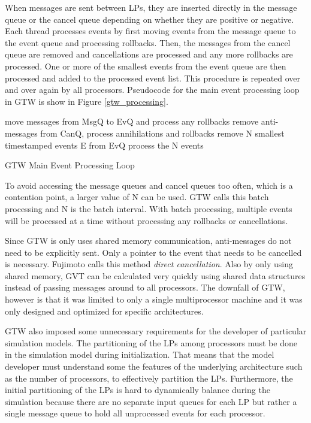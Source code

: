 \documentclass[11pt]{book}
\begin{document}
\noindent
When messages are sent between LPs, they are inserted directly in the message queue or the cancel
queue depending on whether they are positive or negative.  Each thread processes events by first
moving events from the message queue to the event queue and processing rollbacks.  Then, the
messages from the cancel queue are removed and cancellations are processed and any more rollbacks
are processed.  One or more of the smallest events from the event queue are then processed and added
to the processed event list.  This procedure is repeated over and over again by all processors.
Pseudocode for the main event processing loop in GTW is show in Figure \ref{gtw_processing}.

\begin{algorithm}
\DontPrintSemicolon
     {
        move messages from MsgQ to EvQ and process any rollbacks\;
        remove anti-messages from CanQ, process annihilations and rollbacks\;
        remove N smallest timestamped events E from EvQ\;
        process the N events\;
    }
\caption{GTW Main Event Processing Loop\cite{das-94,fujimoto-94}\label{gtw_processing}}
\end{algorithm}

\noindent
To avoid accessing the message queues and cancel queues too often, which is a contention point, a
larger value of N can be used.  GTW calls this batch processing and N is the batch interval.  With
batch processing, multiple events will be processed at a time without processing any rollbacks or
cancellations.

Since GTW is only uses shared memory communication, anti-messages do not need to be
explicitly sent.  Only a pointer to the event that needs to be cancelled is necessary.
Fujimoto calls this method \emph{direct cancellation}.  Also by only using shared memory,
GVT can be calculated very quickly using shared data structures instead of passing
messages around to all processors.  The downfall of GTW, however is that it was limited to
only a single multiprocessor machine and it was only designed and optimized for specific
architectures.

GTW also imposed some unnecessary requirements for the developer of particular simulation models.
The partitioning of the LPs among processors must be done in the simulation model during
initialization.  That means that the model developer must understand some the features of the
underlying architecture such as the number of processors, to effectively partition the LPs.
Furthermore, the initial partitioning of the LPs is hard to dynamically balance during the
simulation because there are no separate input queues for each LP but rather a single message queue
to hold all unprocessed events for each processor.
\end{document}
